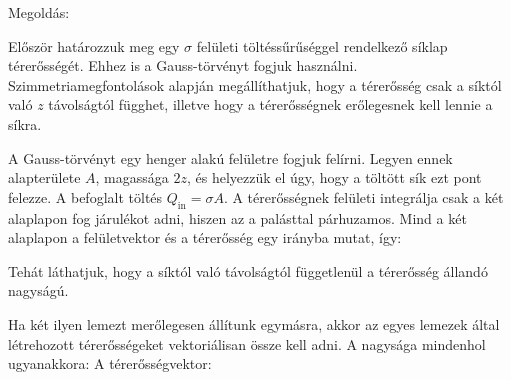 
\ifdefined\megoldas
   

 Megoldás: 

  
 Először határozzuk meg egy $\sigma$ felületi töltéssűrűséggel rendelkező síklap térerősségét. Ehhez is a Gauss-törvényt fogjuk használni. Szimmetriamegfontolások alapján megállíthatjuk, hogy a térerősség csak a síktól való $z$ távolságtól függhet, illetve hogy a térerősségnek erőlegesnek kell lennie a síkra. 

 A Gauss-törvényt egy henger alakú felületre fogjuk felírni. Legyen ennek alapterülete $A$, magassága $2z$, és helyezzük el úgy, hogy a töltött sík ezt pont felezze. A befoglalt töltés $Q_\text{in}=\sigma A$. A térerősségnek felületi integrálja csak a két alaplapon fog járulékot adni, hiszen az a palásttal párhuzamos. Mind a két alaplapon a felületvektor és a térerősség egy irányba mutat, így:

 Tehát láthatjuk, hogy a síktól való távolságtól függetlenül a térerősség állandó nagyságú. 

 Ha két ilyen lemezt merőlegesen állítunk egymásra, akkor az egyes lemezek által létrehozott térerősségeket vektoriálisan össze kell adni. A nagysága mindenhol ugyanakkora:
 A térerősségvektor:
 
\fi